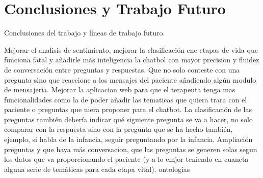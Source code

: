 \chapter{Conclusiones y Trabajo Futuro}
\label{cap:conclusiones}

Conclusiones del trabajo y líneas de trabajo futuro.


Mejorar el analisis de sentimiento, mejorar la clasificación ene etapas de vida que funciona fatal y añadirle más inteligencia la chatbol con mayor precision y fluidez de conversación entre preguntas y respuestas. Que no solo conteste con una pregunta sino que reaccione a los mensajes del paciente añadiendo algún modulo de mensajería. Mejorar la aplicacion web para que el terapeuta tenga mas funcionalidades como la de poder añadir las tematicas que quiera trara con el paciente o preguntas que uiera proponer para el chatbot. La clasificación de las preguntas también debería indicar qué siguiente pregunta se va a hacer, no solo comparar con la respuesta sino con la pregunta que se ha hecho también, ejemplo, si habla de la infancia, seguir preguntando por la infancia. Ampliación preguntas y que haya más conversacion, que las preguntas se generen solas segun los datos que va proporcionando el paciente (y a lo emjor teniendo en cuaneta alguna serie de temáticas para cada etapa vital). ontologías